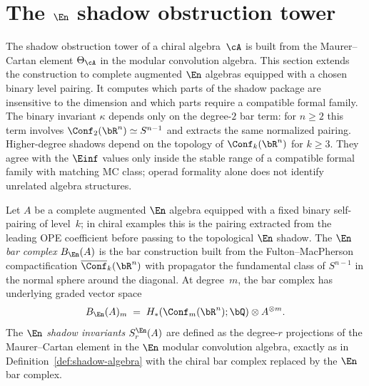 
\section{\texorpdfstring{The $\En$ shadow obstruction tower}{The En shadow obstruction tower}}
\label{sec:en-shadow-tower}

The shadow obstruction tower of a chiral algebra~$\cA$ is built from the
Maurer--Cartan element $\Theta_\cA$ in the modular convolution
algebra. This section extends the construction to complete
augmented $\En$ algebras equipped with a chosen binary level pairing.
It computes which parts of the shadow package are insensitive to
the dimension and which parts require a compatible formal family.
The binary invariant $\kappa$ depends only on the degree-$2$ bar
term: for $n\geq2$ this term involves
$\Conf_2(\bR^n) \simeq S^{n-1}$ and extracts the same normalized
pairing. Higher-degree shadows depend on the topology of
$\Conf_k(\bR^n)$ for $k\geq3$. They agree with the $\Einf$ values
only inside the stable range of a compatible formal family with
matching MC class; operad formality alone does not identify
unrelated algebra structures.

\begin{definition}
\label{def:en-shadow-tower}
Let $A$ be a complete augmented $\En$ algebra equipped with a fixed
binary self-pairing of level~$k$; in chiral examples this is the
pairing extracted from the leading OPE coefficient before passing to
the topological $\En$ shadow.
The \emph{$\En$ bar complex} $B_{\En}(A)$ is the bar construction
built from the Fulton--MacPherson compactification
$\overline{\Conf}_k(\bR^n)$ with propagator the fundamental class
of $S^{n-1}$ in the normal sphere around the diagonal. At degree~$m$,
the bar complex has underlying graded vector space
\[
B_{\En}(A)_m
\;=\;
H_*(\Conf_m(\bR^n); \bQ) \otimes A^{\otimes m}.
\]
The \emph{$\En$ shadow invariants} $S_r^{\En}(A)$ are defined as
the degree-$r$ projections of the Maurer--Cartan element in the
$\En$ modular convolution algebra, exactly as in
Definition~\ref{def:shadow-algebra} with the chiral bar complex
replaced by the $\En$ bar complex.
\end{definition}


